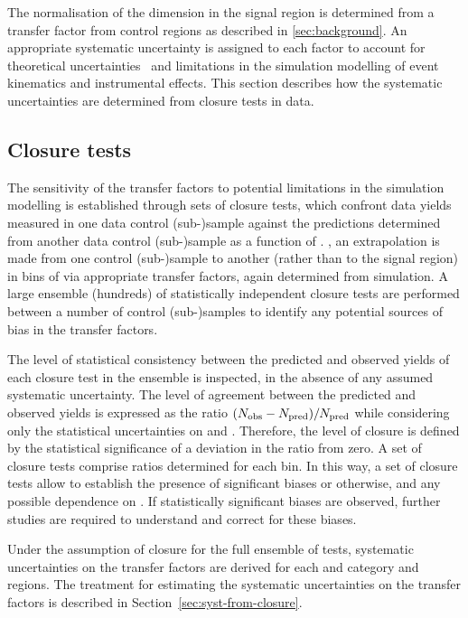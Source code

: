 The normalisation of the \mht dimension in the signal region is determined from 
a transfer factor from control regions as described in \ref{sec:background}. 
An appropriate systematic uncertainty is assigned to each factor to
account for theoretical uncertainties~\cite{Bern:2011pa} and
limitations in the simulation modelling of event kinematics and
instrumental effects. This section describes how the systematic
uncertainties are determined from closure tests in data.

\subsection{Closure tests\label{sec:closure-tests-desc}}

The sensitivity of the transfer factors to potential limitations in
the simulation modelling is established through sets of closure tests,
which confront data yields measured in one data control (sub-)sample
against the predictions determined from another data control
(sub-)sample as a function of \scalht. \ie, an extrapolation is made
from one control (sub-)sample to another (rather than to the signal
region) in bins of \scalht via appropriate transfer factors, again
determined from simulation. A large ensemble (\ie hundreds) of
statistically independent closure tests are performed between a number
of control (sub-)samples to identify any potential sources of bias in
the transfer factors.

The level of statistical consistency between the predicted and
observed yields of each closure test in the ensemble is inspected, in
the absence of any assumed systematic uncertainty. The level of
agreement between the predicted and observed yields is expressed as
the ratio $(\nobs - \npre)/\npre$ while considering only the
statistical uncertainties on \npre and \nobs. Therefore, the level of
closure is defined by the statistical significance of a deviation in
the ratio from zero. A set of closure tests comprise ratios determined
for each \scalht bin. In this way, a set of closure tests allow to
establish the presence of significant biases or otherwise, and any
possible dependence on \scalht. If statistically significant biases
are observed, further studies are required to understand and correct
for these biases.

Under the assumption of closure for the full ensemble of tests,
systematic uncertainties on the transfer factors are derived for each
\njet and \nb category and \scalht regions. The treatment for
estimating the systematic uncertainties on the transfer factors is
described in Section~\ref{sec:syst-from-closure}.

